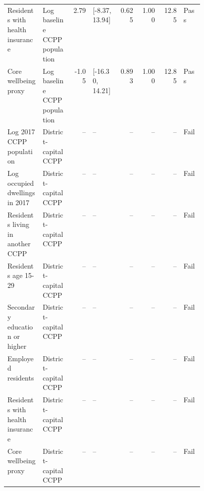 \begin{longtable}{@{}p{0.18\linewidth}p{0.15\linewidth}rp{0.13\linewidth}rrrl@{}}
Residents with health insurance & Log baseline CCPP population & 2.79 & [-8.37, 13.94] & 0.625 & 1.000 & 12.85 & Pass \\
Core wellbeing proxy & Log baseline CCPP population & -1.05 & [-16.30, 14.21] & 0.893 & 1.000 & 12.85 & Pass \\
Log 2017 CCPP population & District-capital CCPP & -- & -- & -- & -- & -- & Fail \\
Log occupied dwellings in 2017 & District-capital CCPP & -- & -- & -- & -- & -- & Fail \\
Residents living in another CCPP & District-capital CCPP & -- & -- & -- & -- & -- & Fail \\
Residents age 15-29 & District-capital CCPP & -- & -- & -- & -- & -- & Fail \\
Secondary education or higher & District-capital CCPP & -- & -- & -- & -- & -- & Fail \\
Employed residents & District-capital CCPP & -- & -- & -- & -- & -- & Fail \\
Residents with health insurance & District-capital CCPP & -- & -- & -- & -- & -- & Fail \\
Core wellbeing proxy & District-capital CCPP & -- & -- & -- & -- & -- & Fail \\
\end{longtable}
\endgroup

